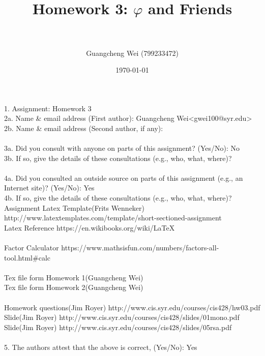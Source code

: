 \documentclass[paper=a4, fontsize=11pt]{scrartcl} %
\title{ 
\horrule{0.5pt} \\[0.4cm] %
\huge Homework 3: $\varphi$ and Friends \\ %
\horrule{2pt} \\[0.5cm] %
}
\author{Guangcheng Wei (799233472)} %
\date{\normalsize\today} %
\numberwithin{equation}{section} %
\numberwithin{figure}{section} %
\begin{document}
\maketitle %

1.  Assignment: Homework 3\\

2a. Name \& email address (First author): Guangcheng Wei<gwei100@syr.edu> \\
2b. Name \& email address (Second author, if any):\\
\\
3a. Did you consult with anyone on parts of this assignment? (Yes/No): No\\
3b. If so, give the details of these consultations (e.g., who, what,    where)?\\
\\
4a. Did you consulted an outside source on parts of this assignment     (e.g., an Internet site)?  (Yes/No): Yes\\
4b. If so, give the details of these consultations (e.g., who, what,     where)?
\\
Assignment Latex Template(Frits Wenneker) http://www.latextemplates.com/template/short-sectioned-assignment\\
Latex Reference https://en.wikibooks.org/wiki/LaTeX\\
\\
Factor Calculator https://www.mathsisfun.com/numbers/factors-all-tool.html\#calc\\
\\
Tex file form Homework 1(Guangcheng Wei)\\
Tex file form Homework 2(Guangcheng Wei)\\
\\
Homework questions(Jim Royer) http://www.cis.syr.edu/courses/cis428/hw03.pdf\\
Slide(Jim Royer) http://www.cis.syr.edu/courses/cis428/slides/01mono.pdf\\
Slide(Jim Royer) http://www.cis.syr.edu/courses/cis428/slides/05rsa.pdf\\
\\
5.  The authors attest that the above is correct, (Yes/No): Yes\\
\end{document}
